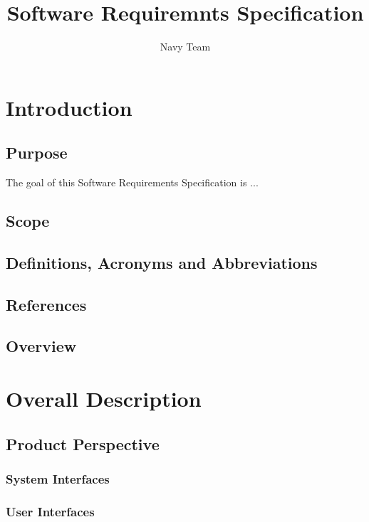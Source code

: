 \documentclass[10pt,a4paper]{article}
\author{Navy Team}
\title{Software Requiremnts Specification}
\begin{document}
	
	\maketitle
	
	\section{Introduction}
	
		\subsection{Purpose}
		
		The goal of this Software Requirements Specification is ...
		
		\subsection{Scope}
		
		\subsection{Definitions, Acronyms and Abbreviations}
		
		\subsection{References}
		
		\subsection{Overview}
	
	\section{Overall Description}
	
		\subsection{Product Perspective}
		
			\subsubsection{System Interfaces}
			
			\subsubsection{User Interfaces}
		
\end{document}

